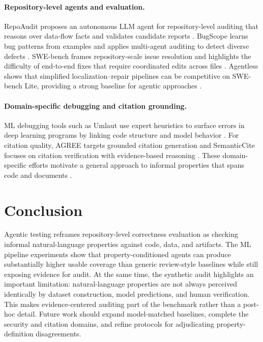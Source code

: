 \documentclass{article}
\theoremstyle{plain}
\theoremstyle{definition}
\theoremstyle{remark}
\begin{document}
\paragraph{Repository-level agents and evaluation.}
RepoAudit proposes an autonomous LLM agent for repository-level auditing that reasons over data-flow facts and validates candidate reports \citep{guo2025repoaudit}.
BugScope learns bug patterns from examples and applies multi-agent auditing to detect diverse defects \citep{liu2025bugscope}.
SWE-bench frames repository-scale issue resolution and highlights the difficulty of end-to-end fixes that require coordinated edits across files \citep{jimenez2024swebench}.
Agentless shows that simplified localization--repair pipelines can be competitive on SWE-bench Lite, providing a strong baseline for agentic approaches \citep{xia2024agentless}.

\paragraph{Domain-specific debugging and citation grounding.}
ML debugging tools such as Umlaut use expert heuristics to surface errors in deep learning programs by linking code structure and model behavior \citep{schoop2021umlaut}.
For citation quality, AGREE targets grounded citation generation and SemanticCite focuses on citation verification with evidence-based reasoning \citep{ye2023agree,haan2025semanticcite}.
These domain-specific efforts motivate a general approach to informal properties that spans code and documents \citep{schoop2021umlaut,ye2023agree,haan2025semanticcite}.


\section{Conclusion}
Agentic testing reframes repository-level correctness evaluation as checking informal natural-language properties against code, data, and artifacts.
The ML pipeline experiments show that property-conditioned agents can produce substantially higher usable coverage than generic review-style baselines while still exposing evidence for audit.
At the same time, the synthetic audit highlights an important limitation: natural-language properties are not always perceived identically by dataset construction, model predictions, and human verification.
This makes evidence-centered auditing part of the benchmark rather than a post-hoc detail.
Future work should expand model-matched baselines, complete the security and citation domains, and refine protocols for adjudicating property-definition disagreements.
\end{document}
